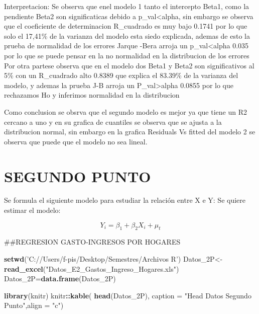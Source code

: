 \documentclass[
]{article}
\newenvironment{Shaded}{\begin{snugshade}}{\end{snugshade}}
\newcommand{\DataTypeTok}[1]{\textcolor[rgb]{0.13,0.29,0.53}{#1}}
\newcommand{\KeywordTok}[1]{\textcolor[rgb]{0.13,0.29,0.53}{\textbf{#1}}}
\newcommand{\NormalTok}[1]{#1}
\newcommand{\OperatorTok}[1]{\textcolor[rgb]{0.81,0.36,0.00}{\textbf{#1}}}
\newcommand{\StringTok}[1]{\textcolor[rgb]{0.31,0.60,0.02}{#1}}
\begin{document}
Interpretacion: Se observa que enel modelo 1 tanto el intercepto Beta1,
como la pendiente Beta2 son significaticas debido a
p\_val\textless alpha, sin embargo se observa que el coeficiente de
determinacion R\_cuadrado es muy bajo 0.1741 por lo que solo el 17,41\%
de la varianza del modelo esta siedo explicada, ademas de esto la prueba
de normalidad de los errores Jarque -Bera arroja un
p\_val\textless alpha 0.035 por lo que se puede pensar en la no
normalidad en la distribucion de los errores Por otra partese observa
que en el modelo dos Beta1 y Beta2 son significativos al 5\% con un
R\_cuadrado alto 0.8389 que explica el 83.39\% de la varianza del
modelo, y ademas la prueba J-B arroja un P\_val\textgreater alpha 0.0855
por lo que rechazamos Ho y inferimos normalidad en la distribucion

Como conclusion se obsrva que el segundo modelo es mejor ya que tiene un
R2 cercano a uno y en su grafica de cuantiles se observa que se ajusta a
la distribucion normal, sin embargo en la grafica Residuals Vs fitted
del modelo 2 se observa que puede que el modelo no sea lineal.

\hypertarget{segundo-punto}{%
\section{SEGUNDO PUNTO}\label{segundo-punto}}

Se formula el siguiente modelo para estudiar la relación entre X e Y: Se
quiere estimar el modelo:

\[Y_{i}=\beta_1+\beta_2X_{i}+\mu_t\]

\#\#REGRESION GASTO-INGRESOS POR HOGARES

\begin{Shaded}
\begin{Highlighting}[]
\KeywordTok{setwd}\NormalTok{(}\StringTok{'C://Users/f-pis/Desktop/Semestres/Archivos R'}\NormalTok{)}
\NormalTok{Datos_2P<-}\KeywordTok{read_excel}\NormalTok{(}\StringTok{"Datos_E2_Gastos_Ingreso_Hogares.xls"}\NormalTok{)}
\NormalTok{Datos_2P=}\KeywordTok{data.frame}\NormalTok{(Datos_2P)}

\KeywordTok{library}\NormalTok{(knitr)}
\NormalTok{knitr}\OperatorTok{::}\KeywordTok{kable}\NormalTok{(}
  \KeywordTok{head}\NormalTok{(Datos_2P), }\DataTypeTok{caption =} \StringTok{"Head Datos Segundo Punto"}\NormalTok{,}\DataTypeTok{align =} \StringTok{"c"}\NormalTok{)}
\end{Highlighting}
\end{Shaded}
\end{document}

